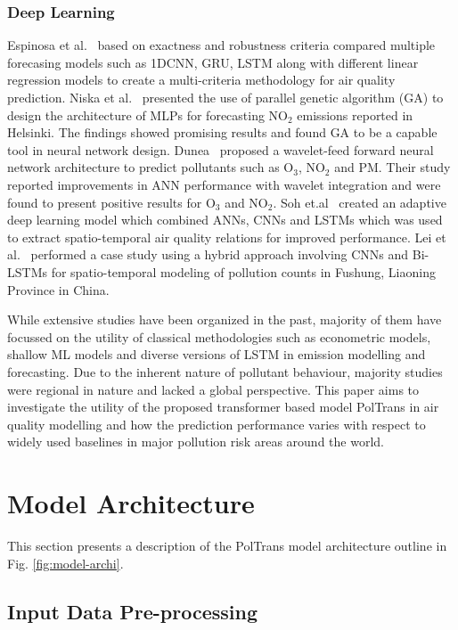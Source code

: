 \documentclass[10pt,journal]{IEEEtran}
\begin{document}
\subsubsection{Deep Learning} Espinosa et al.~\cite{Espinosa.2021} based on exactness and robustness criteria compared multiple forecasing models such as 1DCNN, GRU, LSTM along with different linear regression models to create a multi-criteria methodology for air quality prediction. Niska et al.~\cite{Niska.2004} presented the use of parallel genetic algorithm (GA) to design the architecture of MLPs for forecasting NO${_2}$ emissions reported in Helsinki. The findings showed promising results and found GA to be a capable tool in neural network design. Dunea~\cite{Dunea.2015} proposed a wavelet-feed forward neural network architecture to predict pollutants such as O${_3}$,  NO${_2}$ and PM. Their study reported improvements in ANN performance with wavelet integration and were found to present positive results for O${_3}$ and  NO${_2}$. Soh et.al~\cite{Soh.2018} created an adaptive deep learning model which combined ANNs, CNNs and LSTMs which was used to extract spatio-temporal air quality relations for improved performance. Lei et al.~\cite{Lei.2020} performed a case study using a hybrid approach involving CNNs and Bi-LSTMs for spatio-temporal modeling of pollution counts in Fushung, Liaoning Province in China. 

While extensive studies have been organized in the past, majority of them have focussed on the utility of classical methodologies such as econometric models, shallow ML models and diverse versions of LSTM in emission modelling and forecasting. Due to the inherent nature of pollutant behaviour, majority studies were regional in nature and lacked a global perspective. This paper aims to investigate the utility of the proposed transformer based model {PolTrans}  in air quality modelling and how the prediction performance varies with respect to widely used baselines in major pollution risk areas around the world.

\section{Model Architecture}
\label{sec:model-archi}

This section presents a description of the {PolTrans}  model architecture outline in Fig. \ref{fig:model-archi}.

\subsection{Input Data Pre-processing}
\end{document}
